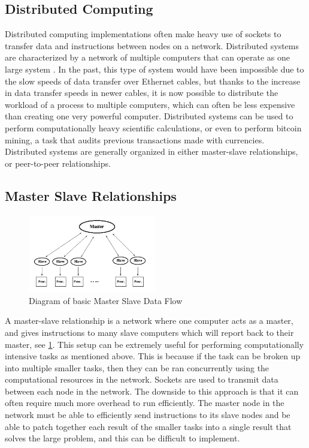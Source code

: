 \documentclass[conference, 12pt]{IEEEtran}
\begin{document}
\subsection{Distributed Computing}
Distributed computing implementations often make heavy use of sockets to transfer data and instructions between nodes on a network. Distributed systems are characterized by a network of multiple computers that can operate as one large system \cite{lin1995distributed}. In the past, this type of system would have been impossible due to the slow speeds of data transfer over Ethernet cables, but thanks to the increase in data transfer speeds in newer cables, it is now possible to distribute the workload of a process to multiple computers, which can often be less expensive than creating one very powerful computer. Distributed systems can be used to perform computationally heavy scientific calculations, or even to perform bitcoin mining, a task that audits previous transactions made with currencies. Distributed systems are generally organized in either master-slave relationships, or peer-to-peer relationships.

\subsection{Master Slave Relationships}
\begin{figure}[htbp]
    \centering
    \centerline{\includegraphics[width=0.5\textwidth]{Figure1.png}}
    \caption{Diagram of basic Master Slave Data Flow \cite{ramaekers}}
    \label{Figure1}
\end{figure}

A master-slave relationship is a network where one computer acts as a master, and gives instructions to many slave computers which will report back to their master, see \ref{Figure1}. This setup can be extremely useful for performing computationally intensive tasks as mentioned above. This is because if the task can be broken up into multiple smaller tasks, then they can be ran concurrently using the computational resources in the network. Sockets are used to transmit data between each node in the network. The downside to this approach is that it can often require much more overhead to run efficiently. The master node in the network must be able to efficiently send instructions to its slave nodes and be able to patch together each result of the smaller tasks into a single result that solves the large problem, and this can be difficult to implement.
\end{document}
